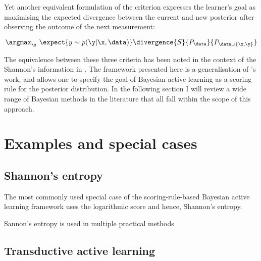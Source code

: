 Yet another equivalent formulation of the criterion expresses the learner's goal as maximising the expected divergence between the current and new posterior after observing the outcome of the next measurement:

\begin{equation}
	\argmax_\x\  \expect{y \sim p(\y\vert \x, \data)}\divergence{S}{P_{\data}}{P_{\data\cup\{\x,\y\}}}
\end{equation}

The equivalence between these three criteria has been noted in the context of the Shannon's information in \citep{MacKay1992}. The framework presented here is a generalisation of \citeauthor{MacKay1992}'s work, and allows one to specify the goal of Bayesian active learning as a scoring rule for the posterior distribution. In the following section I will review a wide range of Bayesian methods in the literature that all fall within the scope of this approach.


\section{Examples and special cases}

\subsection{Shannon's entropy}

The most commonly used special case of the scoring-rule-based Bayesian active learning framework uses the logarithmic score and hence, Shannon's entropy. 

Sannon's entropy is used in multiple practical methods \citep{MacKay1992,Lawrence2004,Krause2006,Ji2008,Settles2010,Houlsby2011,Huszar2012quantum}

\subsection{Transductive active learning}

